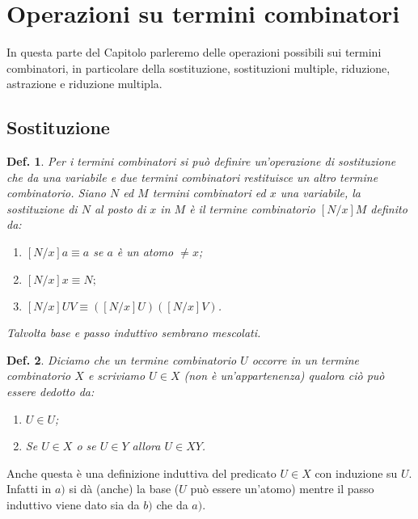 \documentclass{book}
\newtheorem{definizione}{Def.}[chapter]
\begin{document}
\section{Operazioni su termini combinatori}
In questa parte del Capitolo parleremo delle operazioni possibili sui termini
combinatori, in particolare della sostituzione, sostituzioni multiple,
riduzione, astrazione e riduzione multipla.

\subsection{Sostituzione}
\begin{definizione}
Per i termini combinatori si pu\`o definire un'operazione di
\emph{sostituzione} che da una variabile e due termini combinatori
restituisce un altro termine combinatorio.
Siano $N$ ed $M$ termini combinatori ed $x$ una variabile, \emph{la
sostituzione di $N$ al posto di $x$ in $M$} \`e il termine combinatorio
$[N/x]M$ definito da:
\begin{enumerate}
\item$[N/x]a \equiv a$ se $a$ \`e un atomo $\neq x$;
\item$[N/x]x \equiv N;$
\item$[N/x]UV \equiv ([N/x]U)([N/x]V)$.
\end{enumerate}
Talvolta base e passo induttivo sembrano mescolati.
\end{definizione}

\begin{definizione}
Diciamo che un termine combinatorio $U$ \emph{occorre} in un termine
combinatorio $X$ e scriviamo $U \in X$ (non \`e un'appartenenza) qualora ci\`o
pu\`o essere dedotto da:
\begin{enumerate}
\item[a)]$U \in U$;
\item[b)]Se $U \in X$ o se $U \in Y$ allora $ U \in XY$.
\end{enumerate}
\end{definizione}

Anche questa \`e una definizione induttiva del predicato $U \in X$ con
induzione su $U$. Infatti in $a)$ si d\`a (anche) la base ($U$ pu\`o essere
un'atomo) mentre il passo induttivo viene dato sia da $b)$ che da $a)$.
\end{document}
